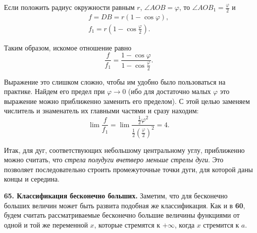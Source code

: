 \documentclass[a4paper,12pt]{article}
\begin{document}
Если положить радиус окружности равным $r$, $\angle AOB = \varphi$, то $\angle AOB_1 = \frac{\varphi}{2}$ и
\begin{gather*}
    f = DB = r(1 - \cos \varphi), \\
    f_1 = r\left(1 - \cos \frac{\varphi}{2}\right).
\end{gather*}

Таким образом, искомое отношение равно
\begin{equation*}
    \frac{f}{f_1} = \frac{1 - \cos \varphi}{1 - \cos \frac{\varphi}{2}}.
\end{equation*}

Выражение это слишком сложно, чтобы им удобно было пользоваться на практике. Найдем его предел при $\varphi \to 0$ (ибо для достаточно малых $\varphi$ это выражение можно приближенно заменить его пределом). С этой целью заменяем числитель и знаменатель их главными частями и сразу находим:
\begin{equation*}
    \lim \frac{f}{f_1} = \lim \frac{\frac{1}{2}\varphi^2}{\frac{1}{2}\left(\frac{\varphi}{2}\right)^2} = 4.
\end{equation*}

Итак, для дуг, соответствующих небольшому центральному углу, приближенно можно считать, что \textit{стрела полудуги вчетверо меньше стрелы дуги}. Это позволяет последовательно строить промежуточные точки дуги, для которой даны концы и середина.

\vspace{1.5em}
\noindent \textbf{65. Классификация бесконечно больших.} Заметим, что для бесконечно больших величин может быть развита подобная же классификация. Как и в \textbf{60}, будем считать рассматриваемые бесконечно большие величины функциями от одной и той же переменной $x$, которые стремятся к $+\infty$, когда $x$ стремится к $a$.
\end{document}
